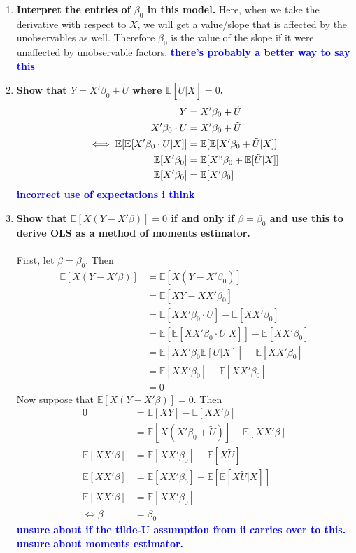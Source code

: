 \documentclass[]{article}
\newcommand{\E}{\mathbb{E}}
\newcommand{\fix} [1] {\textbf{\textcolor{blue}{#1}}} %
\begin{document}
\begin{enumerate}[label = (\roman*)]
\item \textbf{Interpret the entries of $\beta_0$ in this model.} Here, when we take the derivative with respect to $X$, we will get a value/slope that is affected by the unobservables as well. Therefore $\beta_0$ is the value of the slope if it were unaffected by unobservable factors. \fix{there's probably a better way to say this}

\item \textbf{Show that $Y= X'\beta_0+\tilde{U}$ where $\mathbb{E} [\tilde{U}|X] = 0$.} \\
\begin{align*}
Y & = X'\beta_0+\tilde{U} \\
X'\beta_0\cdot U & = X'\beta_0+\tilde{U} \\
\iff \E[\E[X'\beta_0\cdot U|X]] & = \E[\E[X'\beta_0+\tilde{U}|X]] \\
\E[X'\beta_0] & = \E[ X"\beta_0 +\E[\tilde{U}|X]] \\
\E[X'\beta_0] & =\E[X'\beta_0] 
\end{align*}
\fix{incorrect use of expectations i think}

\item \textbf{Show that   $\E[X(Y - X'\beta)] = 0$ if and only if $\beta = \beta_0$ and use this to derive OLS as a method of moments estimator.} \\
\\
First, let $\beta = \beta_0$. Then 
\begin{align*}
\E[X(Y - X'\beta)] & = \E[X(Y - X'\beta_0)] \\
& = \E[XY - XX'\beta_0] \\
& = \E[XX'\beta_0\cdot U] - \E[XX'\beta_0]  \\
& = \E[\E[XX'\beta_0\cdot U|X]] - \E[XX'\beta_0] \\
& = \E[XX'\beta_0\E[U|X]] - \E[XX'\beta_0]\\
& = \E[XX'\beta_0] - \E[XX'\beta_0] \\
& = 0 
\end{align*}
Now suppose that $\E[X(Y - X'\beta)] = 0$. Then
\begin{align*}
0 & = \E[XY] - \E[XX'\beta] \\
& =  \E[X(X'\beta_0 +\tilde{ U})] - \E[XX'\beta] \\
\E[XX'\beta] & = \E[XX'\beta_0] + \E[X\tilde{U}] \\
\E[XX'\beta] & = \E[XX'\beta_0] + \E[\E[X\tilde{U}|X]] \\
\E[XX'\beta] & = \E[XX'\beta_0] \\
\iff \beta & = \beta_0
\end{align*}
\fix{unsure about if the tilde-U assumption from ii carries over to this. unsure about moments estimator.} 



\end{enumerate}
\end{document}
